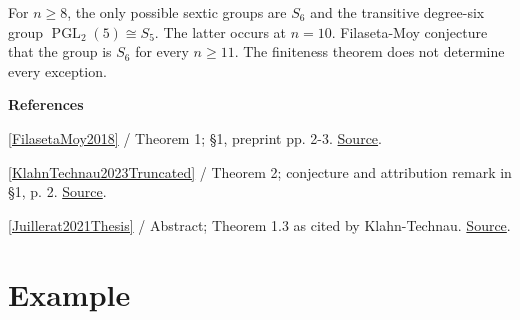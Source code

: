 \documentclass[11pt,a4paper,oneside,openany]{book}
\newenvironment{sources}{\par\smallskip\begingroup\footnotesize\color{atlasgray}\leftskip=10pt\setlength{\parskip}{2pt}}{\par\endgroup\smallskip}
\begin{document}
\color{black} For \(n\ge8\), the only possible sextic groups are \(S_6\) and the transitive degree-six group \(\operatorname{PGL}_2(5)\cong S_5\). The latter occurs at \(n=10\). Filaseta-Moy conjecture that the group is \(S_6\) for every \(n\ge11\). The finiteness theorem does not determine every exception.\par
\begin{sources}
\textbf{References}\par\smallskip
\noindent\hyperlink{ref:FilasetaMoy2018}{[FilasetaMoy2018]} / Theorem 1; §1, preprint pp. 2-3.  \href{https://doi.org/10.4064/cm7474-3-2018}{Source}.\par
\noindent\hyperlink{ref:KlahnTechnau2023Truncated}{[KlahnTechnau2023Truncated]} / Theorem 2; conjecture and attribution remark in §1, p. 2.  \href{https://doi.org/10.1142/S1793042123501208}{Source}.\par
\noindent\hyperlink{ref:Juillerat2021Thesis}{[Juillerat2021Thesis]} / Abstract; Theorem 1.3 as cited by Klahn-Technau.  \href{https://scholarcommons.sc.edu/etd/6321/}{Source}.\par
\end{sources}\color{black}
\section{Example}
\end{document}
